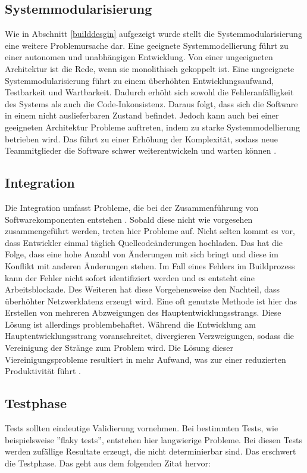 \subsection{Systemmodularisierung}  \label{Systemmodularisierung}
Wie in Abschnitt \ref{builddesgin} aufgezeigt wurde stellt die Systemmodularisierung eine weitere Problemursache dar. Eine geeignete Systemmodellierung führt zu einer autonomen und unabhängigen Entwicklung. Von einer ungeeigneten Architektur ist die Rede, wenn sie monolithisch gekoppelt ist. Eine ungeeignete Systemmodularisierung führt zu einem überhöhten Entwicklungsaufwand, Testbarkeit und Wartbarkeit. Dadurch erhöht sich sowohl die Fehleranfälligkeit des Systems als auch die Code-Inkonsistenz. Daraus folgt, dass sich die Software in einem nicht auslieferbaren Zustand befindet. Jedoch kann auch bei einer geeigneten Architektur Probleme auftreten, indem zu starke Systemmodellierung betrieben wird. Das führt zu einer Erhöhung der Komplexität, sodass neue Teammitglieder die Software schwer weiterentwickeln und warten können \cite{Laukkanen.2017}. 

\subsection{Integration} \label{Integration}
Die Integration umfasst Probleme, die bei der Zusammenführung von Softwarekomponenten entstehen \cite{LianpingEtPaddy.2015}. Sobald diese nicht wie vorgesehen zusammengeführt werden, treten hier Probleme auf. Nicht selten kommt es vor, dass Entwickler einmal täglich Quellcodeänderungen hochladen. Das hat die Folge, dass eine hohe Anzahl von Änderungen mit sich bringt und diese im Konflikt mit anderen Änderungen stehen. Im Fall eines Fehlers im Buildprozess kann der Fehler nicht sofort identifiziert werden und es entsteht eine Arbeitsblockade. Des Weiteren hat diese Vorgehensweise den Nachteil, dass überhöhter Netzwerklatenz erzeugt wird. Eine oft genutzte Methode ist hier das Erstellen von mehreren Abzweigungen des Hauptentwicklungsstrangs. Diese Lösung ist allerdings problembehaftet. Während die Entwicklung am Hauptentwicklungsstrang voranschreitet, divergieren Verzweigungen, sodass die Vereinigung der Stränge zum Problem wird. Die Lösung dieser Viereinigungsprobleme resultiert in mehr Aufwand, was zur einer reduzierten Produktivität führt \cite{Laukkanen.2017}. 

\subsection{Testphase}
Tests sollten eindeutige Validierung vornehmen. Bei bestimmten Tests, wie beispielsweise ''flaky tests'', entstehen hier langwierige Probleme. Bei diesen Tests werden zufällige Resultate erzeugt, die nicht determinierbar sind. Das erschwert die Testphase. Das geht aus dem folgenden Zitat hervor: 

